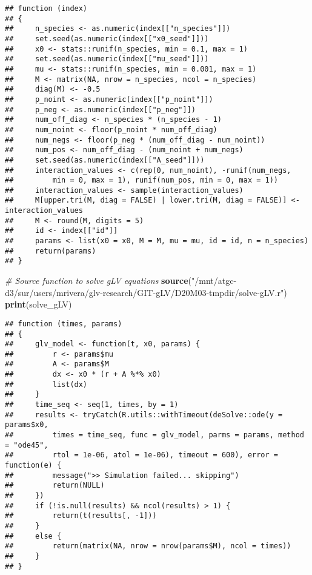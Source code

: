 \documentclass[
]{article}
\newenvironment{Shaded}{\begin{snugshade}}{\end{snugshade}}
\newcommand{\CommentTok}[1]{\textcolor[rgb]{0.56,0.35,0.01}{\textit{#1}}}
\newcommand{\FunctionTok}[1]{\textcolor[rgb]{0.13,0.29,0.53}{\textbf{#1}}}
\newcommand{\NormalTok}[1]{#1}
\newcommand{\StringTok}[1]{\textcolor[rgb]{0.31,0.60,0.02}{#1}}
\begin{document}
\begin{verbatim}
## function (index) 
## {
##     n_species <- as.numeric(index[["n_species"]])
##     set.seed(as.numeric(index[["x0_seed"]]))
##     x0 <- stats::runif(n_species, min = 0.1, max = 1)
##     set.seed(as.numeric(index[["mu_seed"]]))
##     mu <- stats::runif(n_species, min = 0.001, max = 1)
##     M <- matrix(NA, nrow = n_species, ncol = n_species)
##     diag(M) <- -0.5
##     p_noint <- as.numeric(index[["p_noint"]])
##     p_neg <- as.numeric(index[["p_neg"]])
##     num_off_diag <- n_species * (n_species - 1)
##     num_noint <- floor(p_noint * num_off_diag)
##     num_negs <- floor(p_neg * (num_off_diag - num_noint))
##     num_pos <- num_off_diag - (num_noint + num_negs)
##     set.seed(as.numeric(index[["A_seed"]]))
##     interaction_values <- c(rep(0, num_noint), -runif(num_negs, 
##         min = 0, max = 1), runif(num_pos, min = 0, max = 1))
##     interaction_values <- sample(interaction_values)
##     M[upper.tri(M, diag = FALSE) | lower.tri(M, diag = FALSE)] <- interaction_values
##     M <- round(M, digits = 5)
##     id <- index[["id"]]
##     params <- list(x0 = x0, M = M, mu = mu, id = id, n = n_species)
##     return(params)
## }
\end{verbatim}

\begin{Shaded}
\begin{Highlighting}[]
\CommentTok{\# Source function to solve gLV equations}
\FunctionTok{source}\NormalTok{(}\StringTok{"/mnt/atgc{-}d3/sur/users/mrivera/glv{-}research/GIT{-}gLV/D20M03{-}tmpdir/solve{-}gLV.r"}\NormalTok{)}
\FunctionTok{print}\NormalTok{(solve\_gLV)}
\end{Highlighting}
\end{Shaded}

\begin{verbatim}
## function (times, params) 
## {
##     glv_model <- function(t, x0, params) {
##         r <- params$mu
##         A <- params$M
##         dx <- x0 * (r + A %*% x0)
##         list(dx)
##     }
##     time_seq <- seq(1, times, by = 1)
##     results <- tryCatch(R.utils::withTimeout(deSolve::ode(y = params$x0, 
##         times = time_seq, func = glv_model, parms = params, method = "ode45", 
##         rtol = 1e-06, atol = 1e-06), timeout = 600), error = function(e) {
##         message(">> Simulation failed... skipping")
##         return(NULL)
##     })
##     if (!is.null(results) && ncol(results) > 1) {
##         return(t(results[, -1]))
##     }
##     else {
##         return(matrix(NA, nrow = nrow(params$M), ncol = times))
##     }
## }
\end{verbatim}
\end{document}
